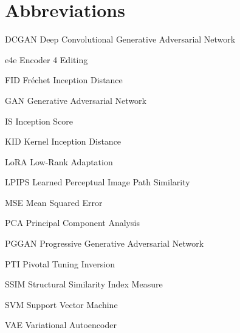 \newcommand{\abbrlabel}[1]{\makebox[3cm][l]{\textbf{#1}\ \dotfill}}
\newenvironment{abbreviations}{\begin{list}{}{\renewcommand{\makelabel}{\abbrlabel}}}{\end{list}}
\section*{Abbreviations}
\begin{abbreviations}
\item[DCGAN] Deep Convolutional Generative Adversarial Network
\item[e4e] Encoder 4 Editing
\item[FID] Fr\'echet Inception Distance
\item[GAN] Generative Adversarial Network
\item[IS] Inception Score
\item[KID] Kernel Inception Distance
\item[LoRA] Low-Rank Adaptation
\item[LPIPS] Learned Perceptual Image Path Similarity
\item[MSE] Mean Squared Error
\item[PCA] Principal Component Analysis
\item[PGGAN] Progressive Generative Adversarial Network
\item[PTI] Pivotal Tuning Inversion
\item[SSIM] Structural Similarity Index Measure
\item[SVM] Support Vector Machine
\item[VAE] Variational Autoencoder
\end{abbreviations}